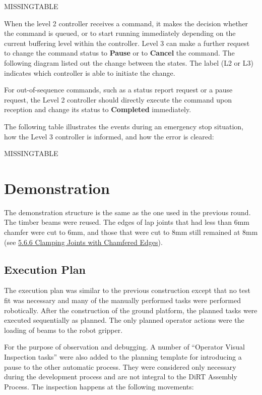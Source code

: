 MISSINGTABLE

When the level 2 controller receives a command, it makes the decision whether the command is queued, or to start running immediately depending on the current buffering level within the controller. Level 3 can make a further request to change the command status to \textbf{Pause }or to \textbf{Cancel }the command. The following diagram listed out the change between the states. The label (L2 or L3) indicates which controller is able to initiate the change. 

For out-of-sequence commands, such as a status report request or a pause request, the Level 2 controller should directly execute the command upon reception and change its status to \textbf{Completed }immediately.




The following table illustrates the events during an emergency stop situation, how the Level 3 controller is informed, and how the error is cleared:

MISSINGTABLE

\section{Demonstration}
\label{section:exploration_3_demonstration}

The demonstration structure is the same as the one used in the previous round. The timber beams were reused. The edges of lap joints that had less than 6mm chamfer were cut to 6mm, and those that were cut to 8mm still remained at 8mm (see \ul{5.6.6 Clamping Joints with Chamfered Edges}). 

\subsection{Execution Plan}
\label{subsection:exploration_3_execution_plan}

The execution plan was similar to the previous construction except that no test fit was necessary and many of the manually performed tasks were performed robotically. After the construction of the ground platform, the planned tasks were executed sequentially as planned. The only planned operator actions were the loading of beams to the robot gripper. 

For the purpose of observation and debugging. A number of ``Operator Visual Inspection tasks'' were also added to the planning template for introducing a pause to the other automatic process. They were considered only necessary during the development process and are not integral to the DiRT Assembly Process. The inspection happens at the following movements:

